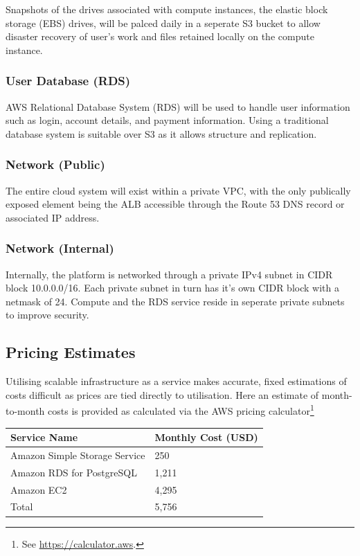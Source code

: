 Snapshots of the drives associated with compute instances, the elastic block storage (EBS) drives, will be palced daily in a seperate S3 bucket to allow disaster recovery of user's work and files retained locally on the compute instance.

\subsubsection*{User Database (RDS)}

AWS Relational Database System (RDS) will be used to handle user information such as login, account details, and payment information. Using a traditional database system is suitable over S3 as it allows structure and replication.

\subsubsection*{Network (Public)}

The entire cloud system will exist within a private VPC, with the only publically exposed element being the ALB accessible through the Route 53 DNS record or associated IP address.

\subsubsection*{Network (Internal)}

Internally, the platform is networked through a private IPv4 subnet in CIDR block 10.0.0.0/16. Each private subnet in turn has it's own CIDR block with a netmask of 24. Compute and the RDS service reside in seperate private subnets to improve security.

\subsection{Pricing Estimates}

Utilising scalable infrastructure as a service makes accurate, fixed estimations of costs difficult as prices are tied directly to utilisation. Here an estimate of month-to-month costs is provided as calculated via the AWS pricing calculator\footnote{See \url{https://calculator.aws}.}
\def\arraystretch{1.5}
\begin{table}[H]
    \centering
    \begin{tabular}{|l|l|}
        \hline
        \textbf{Service Name}                 & \textbf{Monthly Cost (USD)} \\
        \hline
        Amazon Simple Storage Service & 250                                                          \\
        Amazon RDS for PostgreSQL     & 1,211                                                        \\
        Amazon EC2                    & 4,295                                                        \\
        \hline
        \hline
        Total                         & 5,756 \\
        \hline                                                  
    \end{tabular}
\end{table}

